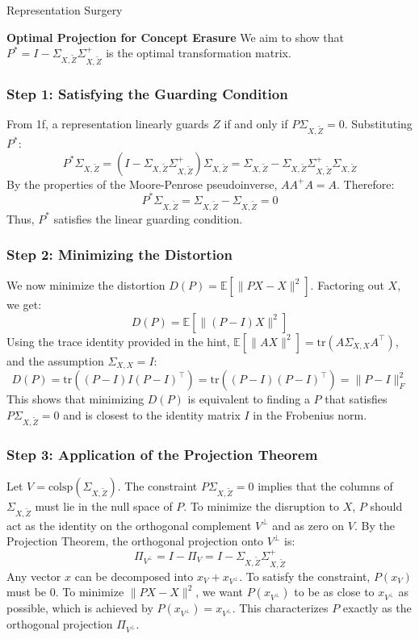 \begin{question}{Representation Surgery}
\begin{subquestion}{\textbf{Optimal Projection for Concept Erasure}}
We aim to show that $P^* = I - \Sigma_{X,\tilde{Z}}\Sigma_{X,\tilde{Z}}^{+}$ is the optimal transformation matrix. 

\subsubsection*{Step 1: Satisfying the Guarding Condition}
From 1f, a representation linearly guards $Z$ if and only if $P \Sigma_{X,\tilde{Z}} = 0$. Substituting $P^*$:
$$P^* \Sigma_{X,\tilde{Z}} = (I - \Sigma_{X,\tilde{Z}}\Sigma_{X,\tilde{Z}}^{+}) \Sigma_{X,\tilde{Z}} = \Sigma_{X,\tilde{Z}} - \Sigma_{X,\tilde{Z}}\Sigma_{X,\tilde{Z}}^{+}\Sigma_{X,\tilde{Z}}$$
By the properties of the Moore-Penrose pseudoinverse, $AA^+A = A$. Therefore:
$$P^* \Sigma_{X,\tilde{Z}} = \Sigma_{X,\tilde{Z}} - \Sigma_{X,\tilde{Z}} = 0$$
Thus, $P^*$ satisfies the linear guarding condition.

\subsubsection*{Step 2: Minimizing the Distortion}
We now minimize the distortion $D(P) = \mathbb{E}[\|PX - X\|^2]$. Factoring out $X$, we get:
$$D(P) = \mathbb{E}[\|(P-I)X\|^2]$$
Using the trace identity provided in the hint, $\mathbb{E}[\|AX\|^2] = \text{tr}(A\Sigma_{X,X}A^\top)$, and the assumption $\Sigma_{X,X} = I$:
$$D(P) = \text{tr}((P-I)I(P-I)^\top) = \text{tr}((P-I)(P-I)^\top) = \|P-I\|_F^2$$
This shows that minimizing $D(P)$ is equivalent to finding a $P$ that satisfies $P \Sigma_{X,\tilde{Z}} = 0$ and is closest to the identity matrix $I$ in the Frobenius norm.

\subsubsection*{Step 3: Application of the Projection Theorem}
Let $V = \text{colsp}(\Sigma_{X,\tilde{Z}})$. The constraint $P \Sigma_{X,\tilde{Z}} = 0$ implies that the columns of $\Sigma_{X,\tilde{Z}}$ must lie in the null space of $P$. To minimize the disruption to $X$, $P$ should act as the identity on the orthogonal complement $V^\perp$ and as zero on $V$.
By the Projection Theorem, the orthogonal projection onto $V^\perp$ is:
$$\Pi_{V^\perp} = I - \Pi_V = I - \Sigma_{X,\tilde{Z}}\Sigma_{X,\tilde{Z}}^{+}$$
Any vector $x$ can be decomposed into $x_V + x_{V^\perp}$. To satisfy the constraint, $P(x_V)$ must be $0$. To minimize $\|PX - X\|^2$, we want $P(x_{V^\perp})$ to be as close to $x_{V^\perp}$ as possible, which is achieved by $P(x_{V^\perp}) = x_{V^\perp}$. This characterizes $P$ exactly as the orthogonal projection $\Pi_{V^\perp}$. 


\end{subquestion}
\end{question}

